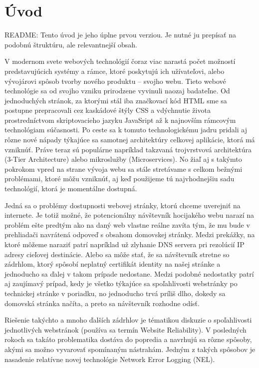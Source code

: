 \chapter{Úvod}
\label{uvod}

README: Tento úvod je jeho úplne prvou verziou. Je nutné ju prepísať na podobnú štruktúru, ale relevantnejší obsah.

\vspace{1cm}


V modernom svete webových technológií čoraz viac narastá počet možností predstavujúcich systémy a rámce, ktoré 
poskytujú ich užívateľovi, alebo vývojárovi spôsob tvorby nového produktu -- svojho webu. Tieto webové technológie sa 
od svojho vzniku prirodzene vyvinuli naozaj badateľne. Od jednoduchých stránok, za ktorými stál iba značkovací kód 
HTML sme sa postupne prepracovali cez kaskádové štýly CSS a vdýchnutie života prostredníctvom skriptovacieho jazyku 
JavaSript až k najnovším rámcovým technológiam súčasnosti. Po ceste sa k tomuto technologickému jadru pridali aj rôzne 
nové nápady týkajúce sa samotnej architektúry celkovej aplikácie, ktorá má vzniknúť. Práve teraz sú populárne 
napríklad takzvaná trojvrstvová architektúra (3-Tier Architecture) alebo mikroslužby (Microservices). No žiaľ aj s 
takýmto pokrokom vpred na strane vývoja webu sa stále stretávame s celkom bežnými problémami, ktoré môžu vzniknúť, aj 
keď použijeme tú najvhodnejšiu sadu technológií, ktorá je momentálne dostupná.

Jedná sa o problémy dostupnosti webovej stránky, ktorú chceme uverejniť na internete. Je totiž možné, že
potencionálny návštevník hocijakého webu narazí na problém ešte predtým ako na daný web vlastne reálne zavíta tým, že 
mu bude v prehliadači navrátená odpoveď s obsahom domovskej stránky. Medzi prekážky, na ktoré môžeme naraziť patrí 
napríklad už zlyhanie DNS servera pri rezolúcií IP adresy cieľovej destinácie. Alebo sa môže stať, že sa návštevník 
stretne so zádrhlom, ktorý spôsobí neplatný certifikát identity na našej stránke a jednoducho sa ďalej v takom prípade 
nedostane. Medzi podobné nedostatky patrí aj zaujímavý prípad, kedy je všetko týkajúce sa spoľahlivosti webstránky po 
technickej stránke v poriadku, no jednoducho trvá príliš dlho, dokedy sa domovská stránka načíta, a preto sa 
návštevník rozhodne odísť.

Riešenie takýchto a mnoho ďalších zádrhlov je tématikou diskuzie o spoľahlivosti jednotlivých webstránok (používa sa 
termín Website Reliability). V posledných rokoch sa takáto problematika dostáva do popredia a navrhujú sa rôzne 
spôsoby, akými sa možno vyvarovať spomínaným nástrahám. Jedným z takých spôsobov je nasadenie relatívne novej 
technológie Network Error Logging (NEL).

